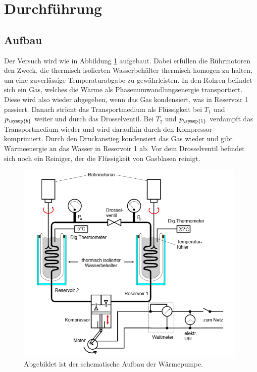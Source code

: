 \section{Durchführung}
\label{sec:Durchführung}
\subsection{Aufbau}
Der Versuch wird wie in Abbildung \ref{fig:Aufbau} aufgebaut.
Dabei erfüllen die Rührmotoren den Zweck, die thermisch isolierten Wasserbehälter thermisch homogen zu halten, um eine zuverlässige Temperaturabgabe zu gewährleisten. 
In den Rohren befindet sich ein Gas, welches die Wärme als Phasenumwandlungsenergie transportiert.
Diese wird also wieder abgegeben, wenn das Gas kondensiert, was in Reservoir 1 passiert. 
Danach strömt das Transportmedium als Flüssigkeit bei $T_1$ und $p_{\symup{b}}$ weiter und durch das Drosselventil.
Bei $T_2$ und $p_{\symup{1}}$ verdampft das Transportmedium wieder und wird daraufhin durch den Kompressor komprimiert.
Durch den Druckanstieg kondensiert das Gas wieder und gibt Wärmeenergie an das Wasser in Reservoir 1 ab.
Vor dem Drosselventil befindet sich noch ein Reiniger, der die Flüssigkeit von Gasblasen reinigt.



\begin{figure}[H]
    \includegraphics[width=\textwidth]{Bilder/aufbau.png}
    \caption{Abgebildet ist der schematische Aufbau der Wärmepumpe. \cite{V206}}
    \label{fig:Aufbau}
\end{figure}

